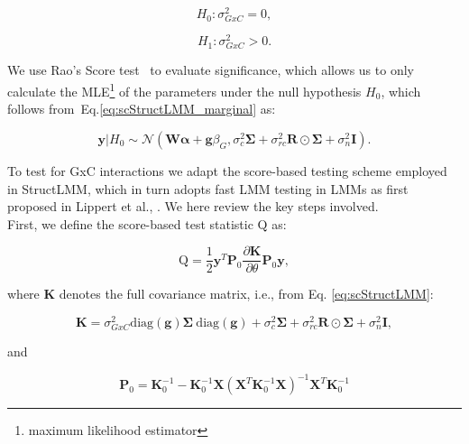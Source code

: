 \begin{equation*}
    H_0: \sigma_{GxC}^2 = 0,
\end{equation*}

\begin{equation*}
    H_1: \sigma_{GxC}^2 > 0.
\end{equation*}

We use Rao's Score test~\cite{rao1948large} to evaluate significance, which allows us to only calculate the MLE\footnote{maximum likelihood estimator} of the parameters under the null hypothesis $H_0$, which follows from~Eq.\eqref{eq:scStructLMM_marginal} as:

\begin{equation}\label{eq:scStructLMM_H0_MVN}
 \mathbf{y}|H_0 \sim \mathcal{N}( \mathbf{W}\boldsymbol{\alpha} + \mathbf{g}\beta_G, \sigma_c^2 \boldsymbol{\Sigma} + \sigma_{rc}^2 \mathbf{R} \odot \boldsymbol{\Sigma}+ \sigma_n^2 \mathbf{I} ). 
\end{equation}

To test for GxC interactions we adapt the score-based testing scheme employed in StructLMM, which in turn adopts fast LMM testing in LMMs as first proposed in Lippert et al., \cite{lippert2011fast}.
We here review the key steps involved.
\\

First, we define the score-based test statistic $\mathrm{Q}$ as:

\begin{equation}\label{eq:Q}
    \mathrm{Q} = \frac{1}{2}\mathbf{y}^T\mathbf{P}_0 \frac{\partial \mathbf{K}}{\partial \theta}\mathbf{P}_0 \mathbf{y}, 
\end{equation}

where $\mathbf{K}$ denotes the full covariance matrix, i.e., from Eq. \eqref{eq:scStructLMM}:

\begin{equation}\label{eq:full_K_scStructLMM}
    \mathbf{K} = \sigma_{GxC}^2\mathrm{diag}(\mathbf{g})\boldsymbol{\Sigma} \ \mathrm{diag}(\mathbf{g}) +  \sigma_c^2 \boldsymbol{\Sigma} + \sigma_{rc}^2 \mathbf{R}\odot\boldsymbol{\Sigma}+ \sigma_n^2 \mathbf{I},
\end{equation}

and 

\begin{equation}
    \mathbf{P}_0 = \mathbf{K}_0^{-1}-\mathbf{K}_0^{-1}\mathbf{X}(\mathbf{X}^T\mathbf{K}_0^{-1}\mathbf{X})^{-1}\mathbf{X}^T\mathbf{K}_0^{-1}
\end{equation}

